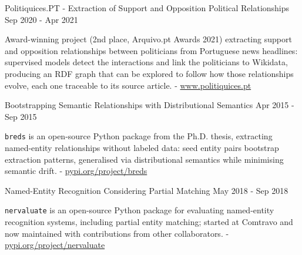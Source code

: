 

\begin{cventries}
  \cvproject
    {Politiquices.PT - Extraction of Support and Opposition Political Relationships} %
	{} %
    {} %
    {Sep 2020 - Apr 2021} %
    {
      \begin{cvitems} %
		  \item{Award-winning project (2nd place, Arquivo.pt Awards 2021) extracting support and opposition relationships between politicians from Portuguese news headlines: supervised models detect the interactions and link the politicians to Wikidata, producing an RDF graph that can be explored to follow how those relationships evolve, each one traceable to its source article. - \href{https://www.politiquices.pt}{\mbox{www.politiquices.pt}}}
      \end{cvitems}
    }
\end{cventries}




\begin{cventries}
 \cvproject
   {Bootstrapping Semantic Relationships with Distributional Semantics} %
   {} %
   {} %
   {Apr 2015 - Sep 2015} %
   {
     \begin{cvitems} %
		\item {\texttt{breds} is an open-source Python package from the Ph.D. thesis, extracting named-entity relationships without labeled data: seed entity pairs bootstrap extraction patterns, generalised via distributional semantics while minimising semantic drift. - \href{https://pypi.org/project/breds}{\mbox{pypi.org/project/breds}}}
     \end{cvitems}
   }
\end{cventries}

\begin{cventries}
 \cvproject
   {Named-Entity Recognition Considering Partial Matching} %
   {} %
   {} %
   {May 2018 - Sep 2018} %
   {
     \begin{cvitems} %
     	\item {\texttt{nervaluate} is an open-source Python package for evaluating named-entity recognition systems, including partial entity matching; started at Comtravo and now maintained with contributions from other collaborators. - \href{https://pypi.org/project/nervaluate}{\mbox{pypi.org/project/nervaluate}}}
     \end{cvitems}
   }
\end{cventries}

